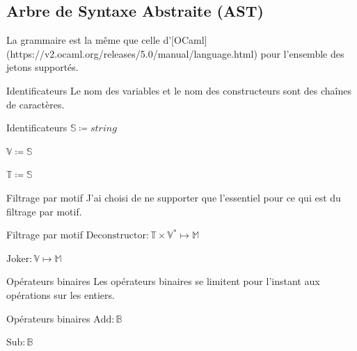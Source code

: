 \documentclass{beamer}
\begin{document}
\subsection{Arbre de Syntaxe Abstraite (AST)}

La grammaire est la même que celle d'[OCaml](https://v2.ocaml.org/releases/5.0/manual/language.html) pour l'ensemble des jetons supportés.

\begin{frame}{Identificateurs}
    Le nom des variables et le nom des constructeurs sont des chaînes de caractères.

    \begin{block}{Identificateurs}
        $\mathbb{S} \coloneqq string$%

        $\mathbb{V} \coloneqq \mathbb{S}$%

        $\mathbb{T} \coloneqq \mathbb{S}$%
    \end{block}
\end{frame}

\begin{frame}{Filtrage par motif}
    J'ai choisi de ne supporter que l'essentiel pour ce qui est du filtrage par motif.%
    
    \begin{block}{Filtrage par motif}
        $\text{Deconstructor} : \mathbb{T} \times \mathbb{V}^{*} \mapsto \mathbb{M}$%

        $\text{Joker} : \mathbb{V} \mapsto \mathbb{M}$%
    \end{block}
\end{frame}

\begin{frame}{Opérateurs binaires}
    Les opérateurs binaires se limitent pour l'instant aux opérations sur les entiers.

    \begin{block}{Opérateurs binaires}
        $\text{Add} : \mathbb{B}$%

        $\text{Sub} : \mathbb{B}$%
    \end{block}
\end{frame}
\end{document}
